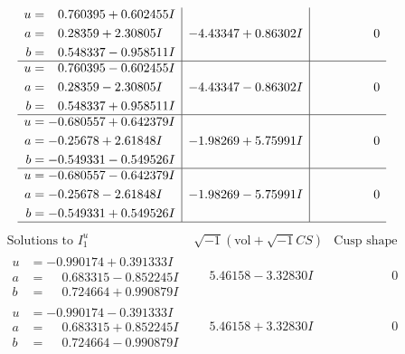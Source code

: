 \documentclass[1p]{elsarticle_modified}
\theoremstyle{definition}
\newcommand{\I}{\sqrt{-1}}
\begin{document}
$$\begin{array}{c|c|c}
\begin{aligned}
u &= \phantom{-}0.760395 + 0.602455 I \\
a &= \phantom{-}0.28359 + 2.30805 I \\
b &= \phantom{-}0.548337 - 0.958511 I\end{aligned}
 & -4.43347 + 0.86302 I & \phantom{-0.000000 } 0 \\ \hline\begin{aligned}
u &= \phantom{-}0.760395 - 0.602455 I \\
a &= \phantom{-}0.28359 - 2.30805 I \\
b &= \phantom{-}0.548337 + 0.958511 I\end{aligned}
 & -4.43347 - 0.86302 I & \phantom{-0.000000 } 0 \\ \hline\begin{aligned}
u &= -0.680557 + 0.642379 I \\
a &= -0.25678 + 2.61848 I \\
b &= -0.549331 - 0.549526 I\end{aligned}
 & -1.98269 + 5.75991 I & \phantom{-0.000000 } 0 \\ \hline\begin{aligned}
u &= -0.680557 - 0.642379 I \\
a &= -0.25678 - 2.61848 I \\
b &= -0.549331 + 0.549526 I\end{aligned}
 & -1.98269 - 5.75991 I & \phantom{-0.000000 } 0\\
 \hline 
 \end{array}$$\newpage$$\begin{array}{c|c|c}  
\text{Solutions to }I^u_{1}& \I (\text{vol} + \sqrt{-1}CS) & \text{Cusp shape}\\
 \hline 
\begin{aligned}
u &= -0.990174 + 0.391333 I \\
a &= \phantom{-}0.683315 - 0.852245 I \\
b &= \phantom{-}0.724664 + 0.990879 I\end{aligned}
 & \phantom{-}5.46158 - 3.32830 I & \phantom{-0.000000 } 0 \\ \hline\begin{aligned}
u &= -0.990174 - 0.391333 I \\
a &= \phantom{-}0.683315 + 0.852245 I \\
b &= \phantom{-}0.724664 - 0.990879 I\end{aligned}
 & \phantom{-}5.46158 + 3.32830 I & \phantom{-0.000000 } 0 \\ \hline\begin{aligned}

\end{aligned}
\end{array}$$
\end{document}
